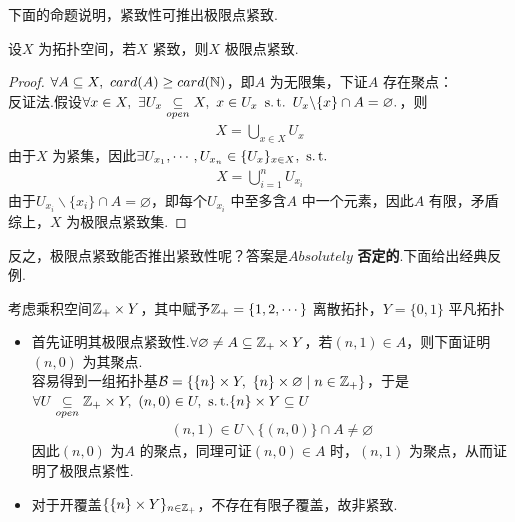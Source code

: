 	\vspace*{2em}
	下面的命题说明，紧致性可推出极限点紧致.
	\begin{proposition}\label{prop 2.2.3}
		设$X$ 为拓扑空间，若$X$ 紧致，则$X$ 极限点紧致.
		
		\vspace*{2em}
		\begin{proof}
			$\forall A \subseteq X , \,\, card(A) \geq card(\mathbb{N})$，即$A$ 为无限集，下证$A$ 存在聚点：\\
			反证法.假设$\forall x \in X , \,\, \exists U_x \underset{open}{\subseteq} X , \,\, x \in U_x \,\, \operatorname{s.t.} \,\, U_x \backslash \{ x \} \cap A = \varnothing.$，则
			\begin{align}
				X = \bigcup_{x \in X}{U_x}
			\end{align}
			由于$X$ 为紧集，因此$\exists U_{x_1} , \cdots , U_{x_n} \in \{ U_x \}_{x \in X} , \,\, \operatorname{s.t.}$
			\begin{align}
				X = \bigcup_{i = 1}^{n}{U_{x_i}}
			\end{align}
			由于$U_{x_i} \backslash \{ x_i \} \cap A = \varnothing$，即每个$U_{x_i}$ 中至多含$A$ 中一个元素，因此$A$ 有限，矛盾\\
			综上，$X$ 为极限点紧致集.
		\end{proof}
	\end{proposition}

	\vspace*{2em}
	反之，极限点紧致能否推出紧致性呢？答案是$Absolutely$ \textbf{否定的}.下面给出经典反例.
	\begin{example}\label{ex 2.2.1}
		考虑乘积空间$\mathbb{Z}_+ \times Y$，其中赋予$\mathbb{Z}_+ = \{ 1 , 2 , \cdots \}$ 离散拓扑，$Y = \{ 0 , 1 \}$ 平凡拓扑\\
		\begin{itemize}
			\item 首先证明其极限点紧致性.$\forall \varnothing \neq A \subseteq \mathbb{Z}_+ \times Y$，若$(n , 1) \in A$，则下面证明$(n , 0)$ 为其聚点.\\
			容易得到一组拓扑基$\mathcal{B} = \{ \{ n \} \times Y , \,\, \{ n \} \times \varnothing \mid n \in \mathbb{Z}_+ \}$，于是\\
			$\forall U \underset{open}{\subseteq} \mathbb{Z}_+ \times Y , \,\, (n , 0) \in U , \,\, \operatorname{s.t.} \{ n \} \times Y \subseteq U$
			\begin{align}
				(n , 1) \in U \backslash \{ (n , 0) \} \cap A \neq \varnothing
			\end{align}
			因此$(n , 0)$ 为$A$ 的聚点，同理可证$(n , 0) \in A$ 时，$(n , 1)$ 为聚点，从而证明了极限点紧性.
			
			\item 对于开覆盖$\{ \{ n \} \times Y \}_{n \in \mathbb{Z}_+}$，不存在有限子覆盖，故非紧致.
		\end{itemize}
	\end{example}

